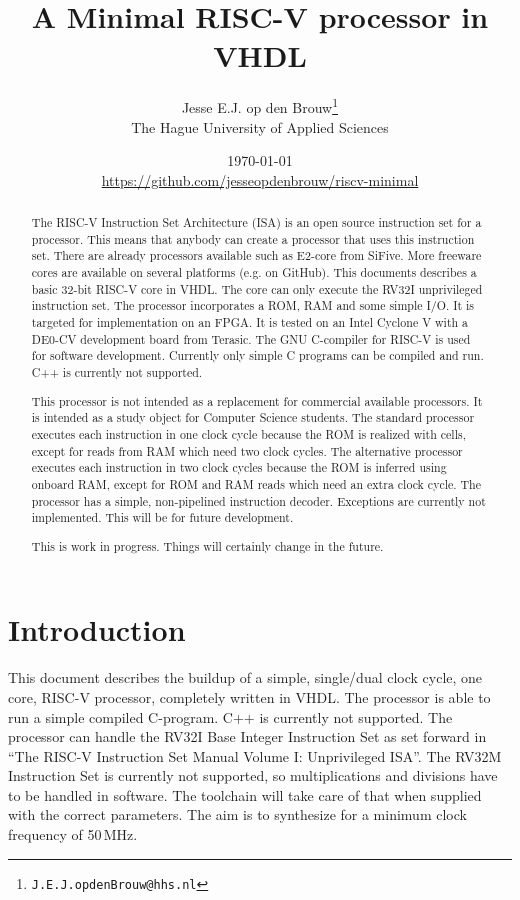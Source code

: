 \documentclass[12pt]{article}
\author{Jesse E.J. op den Brouw\thanks{\texttt{J.E.J.opdenBrouw@hhs.nl}}\\[2ex]The Hague University of Applied Sciences}
\title{A Minimal RISC-V processor in VHDL}
\date{\today\\[2ex]\normalsize\url{https://github.com/jesseopdenbrouw/riscv-minimal}}
\begin{document}
\maketitle

\vfill
\begin{abstract}
\noindent
The RISC-V Instruction Set Architecture (ISA) is an open source instruction set for a processor. This means that anybody can create a processor that uses this instruction set. There are already processors available such as E2-core from SiFive. More freeware cores are available on several platforms (e.g. on GitHub). This documents describes a basic 32-bit RISC-V core in VHDL. The core can only execute the RV32I unprivileged instruction set. The processor incorporates a ROM, RAM and some simple I/O. It is targeted for implementation on an FPGA. It is tested on an Intel Cyclone V with a DE0-CV development board from Terasic. The GNU C-compiler for RISC-V is used for software development. Currently only simple C programs can be compiled and run. C++ is currently not supported.

\noindent
This processor is not intended as a replacement for commercial available processors. It is intended as a study object for Computer Science students. The standard processor executes each instruction in one clock cycle because the ROM is realized with cells, except for reads from RAM which need two clock cycles. The alternative processor executes each instruction in two clock cycles because the ROM is inferred using onboard RAM, except for ROM and RAM reads which need an extra clock cycle. The processor has a simple, non-pipelined instruction decoder. Exceptions are currently not implemented. This will be for future development.

\noindent
This is work in progress. Things will certainly change in the future.
\end{abstract}
\vfill

\clearpage
\tableofcontents

\clearpage
\section{Introduction}
This document describes the buildup of a simple, single/dual clock cycle, one core, RISC-V processor, completely written in VHDL. The processor is able to run a simple compiled C-program. C++ is currently not supported. The processor can handle the RV32I Base Integer Instruction Set as set forward in ``The RISC-V Instruction Set Manual Volume I: Unprivileged ISA''. The RV32M Instruction Set is currently not supported, so multiplications and divisions have to be handled in software. The toolchain will take care of that when supplied with the correct parameters. The aim is to synthesize for a minimum clock frequency of 50\,MHz.
\end{document}
